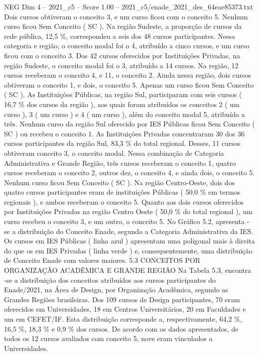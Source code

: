 \begin{textsample}{NEG Dim 4 – 2021\_c5 – Score 1.00 – 2021\_c5/enade\_2021\_des\_64eae85373.txt}
Dois cursos obtiveram o conceito 3, e um curso ficou com o conceito 5.
Nenhum curso ficou Sem Conceito ( SC ).
Na região Sudeste, a proporção de cursos da rede pública, 12,5 \%, correspondeu a seis dos 48 cursos participantes.
Nessa categoria e região, o conceito modal foi o 4, atribuído a cinco cursos, e um curso ficou com o conceito 3.
Dos 42 cursos oferecidos por Instituições Privadas, na região Sudeste, o conceito modal foi o 3, atribuído a 14 cursos.
Na região, 12 cursos receberam o conceito 4, e 11, o conceito 2.
Ainda nessa região, dois cursos obtiveram o conceito 1, e dois, o conceito 5.
Apenas um curso ficou Sem Conceito ( SC ).
As Instituições Públicas, na região Sul, participaram com seis cursos ( 16,7 \% dos cursos da região ), aos quais foram atribuídos os conceitos 2 ( um curso ), 3 ( um curso ) e 4 ( um curso ), além do conceito modal 5, atribuído a três.
Nenhum curso da região Sul oferecido por IES Públicas ficou Sem Conceito ( SC ) ou recebeu o conceito 1.
As Instituições Privadas concentraram 30 dos 36 cursos participantes da região Sul, 83,3 \% do total regional.
Desses, 11 cursos obtiveram conceito 3, o conceito modal.
Nessa combinação de Categoria Administrativa e Grande Região, três cursos receberam o conceito 1, quatro cursos receberam o conceito 2, outros dez, o conceito 4, e ainda dois, o conceito 5.
Nenhum curso ficou Sem Conceito ( SC ).
Na região Centro-Oeste, dois dos quatro cursos participantes eram de instituições Públicas ( 50,0 \% em termos regionais ), e ambos receberam o conceito 5.
Quanto aos dois cursos oferecidos por Instituições Privadas na região Centro Oeste ( 50,0 \% do total regional ), um curso recebeu o conceito 3, e um outro, o conceito 5.
No Gráfico 5.2, apresenta -se a distribuição do Conceito Enade, segundo a Categoria Administrativa da IES.
Os cursos em IES Públicas ( linha azul ) apresentam uma poligonal mais à direita do que os em IES Privadas ( linha verde ) e, consequentemente, uma distribuição de Conceito Enade com valores maiores. 5.3 CONCEITOS POR ORGANIZAÇÃO ACADÊMICA E GRANDE REGIÃO Na Tabela 5.3, encontra -se a distribuição dos conceitos atribuídos aos cursos participantes do Enade/2021, na Área de Design, por Organização Acadêmica, segundo as Grandes Regiões brasileiras.
Dos 109 cursos de Design participantes, 70 eram oferecidos em Universidades, 18 em Centros Universitários, 20 em Faculdades e um em CEFET/IF.
Esta distribuição corresponde a, respectivamente, 64,2 \%, 16,5 \%, 18,3 \% e 0,9 \% dos cursos.
De acordo com os dados apresentados, de todos os 12 cursos avaliados com conceito 5, nove eram vinculados a Universidades.

\end{textsample}
